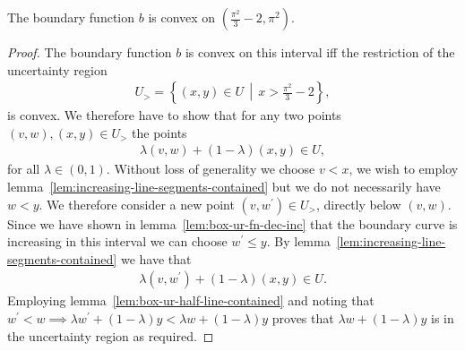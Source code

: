\begin{lem}
The boundary function $b$ is convex on $\left(\frac{\pi^2}{3}-2, \pi^2\right)$.
\end{lem}
\begin{proof}
  The boundary function $b$ is convex on this interval iff the restriction of the uncertainty region
  \begin{align}
    U_{>} = \left\{(x,y)\in U\,\middle|\,x >\frac{\pi^2}{3}-2 \right\},
  \end{align}
  is convex. We therefore have to show that for any two points $(v,w), (x,y)\in U_{>}$ the points
  \begin{align}
    \lambda(v,w) + (1-\lambda)(x,y)\in U,
  \end{align}
  for all $\lambda\in (0,1)$. Without loss of generality we choose $v < x$, we wish to employ lemma~\ref{lem:increasing-line-segments-contained} but we do not necessarily have $w < y$. We therefore consider a new point $(v,w^\prime)\in U_{>}$, directly below $(v,w)$. Since we have shown in lemma~\ref{lem:box-ur-fn-dec-inc} that the boundary curve is increasing in this interval we can choose $w^\prime \leq y$. By lemma~\ref{lem:increasing-line-segments-contained} we have that 
\begin{align}
  \lambda (v,w^\prime) + (1-\lambda)(x,y)\in U.
\end{align}
Employing lemma~\ref{lem:box-ur-half-line-contained} and noting that $w^\prime < w\implies \lambda w^\prime + (1-\lambda) y < \lambda  w+ (1-\lambda) y$ proves that $\lambda  w+ (1-\lambda) y$ is in the uncertainty region as required.
\end{proof}

